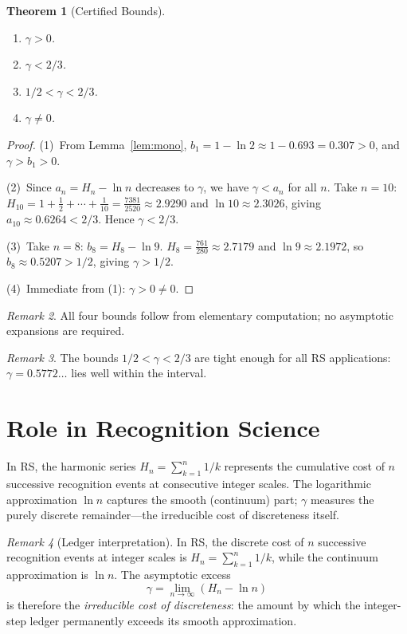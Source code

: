 \documentclass[12pt,a4paper]{article}
\newtheorem{theorem}{Theorem}[section]
\theoremstyle{definition}
\theoremstyle{remark}
\newtheorem{remark}[theorem]{Remark}
\begin{document}
\begin{theorem}[Certified Bounds]
\label{thm:bounds}
\begin{enumerate}
  \item $\gamma > 0$.
  \item $\gamma < 2/3$.
  \item $1/2 < \gamma < 2/3$.
  \item $\gamma \neq 0$.
\end{enumerate}
\end{theorem}

\begin{proof}
(1)~From Lemma~\ref{lem:mono}, $b_1 = 1 - \ln 2 \approx 1 - 0.693
= 0.307 > 0$, and $\gamma > b_1 > 0$.

(2)~Since $a_n = H_n - \ln n$ decreases to $\gamma$, we have
$\gamma < a_n$ for all $n$.  Take $n = 10$:
$H_{10} = 1 + \tfrac{1}{2} + \cdots + \tfrac{1}{10}
= \tfrac{7381}{2520} \approx 2.9290$ and $\ln 10 \approx 2.3026$,
giving $a_{10} \approx 0.6264 < 2/3$.  Hence $\gamma < 2/3$.

(3)~Take $n = 8$: $b_8 = H_8 - \ln 9$.
$H_8 = \tfrac{761}{280} \approx 2.7179$ and $\ln 9 \approx 2.1972$,
so $b_8 \approx 0.5207 > 1/2$, giving $\gamma > 1/2$.

(4)~Immediate from (1): $\gamma > 0 \neq 0$.
\end{proof}

\begin{remark}
All four bounds follow from elementary computation; no asymptotic
expansions are required.
\end{remark}

\begin{remark}
The bounds $1/2 < \gamma < 2/3$ are tight enough for all RS
applications: $\gamma = 0.5772\ldots$ lies well within the interval.
\end{remark}

\section{Role in Recognition Science}
\label{sec:role}

In RS, the harmonic series $H_n = \sum_{k=1}^n 1/k$ represents the
cumulative cost of $n$ successive recognition events at consecutive
integer scales.  The logarithmic approximation $\ln n$ captures the
smooth (continuum) part; $\gamma$ measures the purely discrete
remainder---the irreducible cost of discreteness itself.

\begin{remark}[Ledger interpretation]
\label{rem:ledger}
In RS, the discrete cost of $n$ successive recognition events at
integer scales is $H_n = \sum_{k=1}^n 1/k$, while the continuum
approximation is $\ln n$.  The asymptotic excess
\begin{equation}
  \gamma = \lim_{n\to\infty}(H_n - \ln n)
\end{equation}
is therefore the \emph{irreducible cost of discreteness}: the amount
by which the integer-step ledger permanently exceeds its smooth
approximation.
\end{remark}
\end{document}
